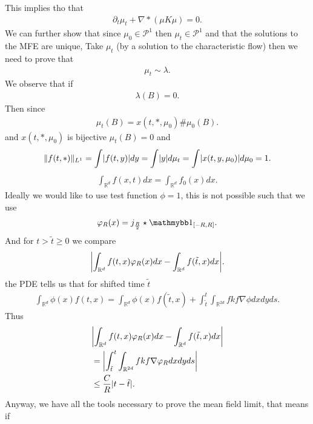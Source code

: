 This implies tho that
\begin{align*}
  \partial_t \mu_t + \nabla * (\mu K \mu ) = 0
.\end{align*}
We can further show that since $\mu_0 \in  \mathcal{P}^{1}$ then $\mu_t \in  \mathcal{P}^{1} $ and that the solutions to the MFE are unique,
Take $\mu_t$ (by a solution to the characteristic flow) then we need to prove that 
\begin{align*}
  \mu_t \sim \lambda 
.\end{align*}
We observe that if 
\begin{align*}
  \lambda(B) = 0
.\end{align*}
Then since
\begin{align*}
  \mu_t(B) = x(t,*,\mu_0) \# \mu_0(B)
.\end{align*}
and $x(t,*,\mu_0)$ is bijective $\mu_t(B) = 0 $ and 
\begin{align*}
  \|f(t,*)\|_{L^{1} } = \int \lvert f(t,y)\rvert dy =  \int \lvert y\rvert d \mu_t  = \int \lvert x(t,y,\mu_0)\rvert d\mu_0  = 1
.\end{align*}
\begin{align*}
  \int_{\mathbb{R}^{d} } f(x,t) dx  = \int_{\mathbb{R}^{d} } f_0(x)  dx
.\end{align*}
Ideally we would like to use test function $\phi =1$, this is not possible such that we use 
\begin{align*}
  \phi_R(x) = j_{\frac{R}{2}} \star \cha_{[-R,R]}
.\end{align*}
And for $t>\tilde{t} \ge 0 $ we compare 
\begin{align*}
  \abs*{\int_{\mathbb{R}^{d} } f(t,x)\phi_R(x) dx - \int_{\mathbb{R}^{d} } f(\tilde{t},x ) dx } 
.\end{align*}
the PDE tells us that for shifted time $\tilde{t}$ 
\begin{align*}
  \int_{\mathbb{R}^{d} } \phi(x) f(t,x) = \int_{\mathbb{R}^{d} } \phi(x) f(\tilde{t},x ) + \int_{\tilde{t} }^{t} \int_{\mathbb{R}^{2d} }  fkf \nabla \phi dxdyds
.\end{align*}
Thus
\begin{align*}
  &\abs*{\int_{\mathbb{R}^{d} } f(t,x)\phi_R(x) dx - \int_{\mathbb{R}^{d} } f(\tilde{t},x ) dx } \\
  &=  \abs*{\int_{\tilde{t} }^{t} \int_{\mathbb{R}^{2d} } fkf \nabla \phi_{R} dx dy ds} \\
  &\le  \frac{C}{R} \abs{t-\tilde{t} }
.\end{align*}
Anyway, we have all the tools necessary to prove the mean field limit, that means if 
